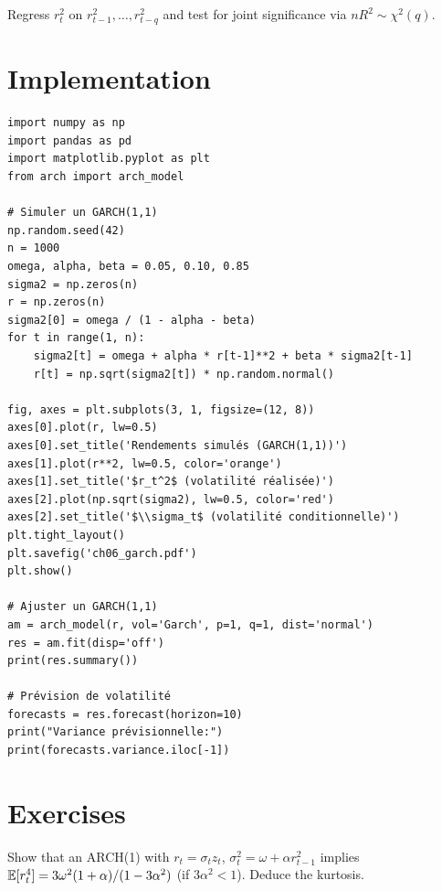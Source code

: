 \begin{definition}
Regress $r_t^2$ on $r_{t-1}^2,\ldots,r_{t-q}^2$ and test for joint significance via $nR^2\sim\chi^2(q)$.
\end{definition}

\section{Implementation}

\begin{codeblock}[title=\textbf{Python}]
\begin{verbatim}
import numpy as np
import pandas as pd
import matplotlib.pyplot as plt
from arch import arch_model

# Simuler un GARCH(1,1)
np.random.seed(42)
n = 1000
omega, alpha, beta = 0.05, 0.10, 0.85
sigma2 = np.zeros(n)
r = np.zeros(n)
sigma2[0] = omega / (1 - alpha - beta)
for t in range(1, n):
    sigma2[t] = omega + alpha * r[t-1]**2 + beta * sigma2[t-1]
    r[t] = np.sqrt(sigma2[t]) * np.random.normal()

fig, axes = plt.subplots(3, 1, figsize=(12, 8))
axes[0].plot(r, lw=0.5)
axes[0].set_title('Rendements simulés (GARCH(1,1))')
axes[1].plot(r**2, lw=0.5, color='orange')
axes[1].set_title('$r_t^2$ (volatilité réalisée)')
axes[2].plot(np.sqrt(sigma2), lw=0.5, color='red')
axes[2].set_title('$\\sigma_t$ (volatilité conditionnelle)')
plt.tight_layout()
plt.savefig('ch06_garch.pdf')
plt.show()

# Ajuster un GARCH(1,1)
am = arch_model(r, vol='Garch', p=1, q=1, dist='normal')
res = am.fit(disp='off')
print(res.summary())

# Prévision de volatilité
forecasts = res.forecast(horizon=10)
print("Variance prévisionnelle:")
print(forecasts.variance.iloc[-1])
\end{verbatim}
\end{codeblock}

\section{Exercises}

\begin{exercise}[$\star$]
Show that an ARCH(1) with $r_t=\sigma_t z_t$, $\sigma_t^2=\omega+\alpha r_{t-1}^2$ implies $\mathbb{E}[r_t^4]=3\omega^2(1+\alpha)/(1-3\alpha^2)$ (if $3\alpha^2<1$). Deduce the kurtosis.
\end{exercise}

